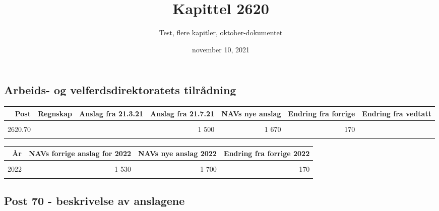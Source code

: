 \documentclass[
]{article}
\title{Kapittel 2620}
\author{Test, flere kapitler, oktober-dokumentet}
\date{november 10, 2021}
\begin{document}
\maketitle

\hypertarget{arbeids--og-velferdsdirektoratets-tilruxe5dning}{%
\subsection{Arbeids- og velferdsdirektoratets
tilrådning}\label{arbeids--og-velferdsdirektoratets-tilruxe5dning}}

\begingroup\fontsize{8}{10}\selectfont

\begin{tabular}{rrrrrrr}
\toprule
Post & Regnskap  & Anslag fra 21.3.21 & Anslag fra 21.7.21 & NAVs nye anslag & Endring fra forrige & Endring fra vedtatt\\
\midrule
\cellcolor{gray!6}{2620.70} & \cellcolor{gray!6}{1 669} & \cellcolor{gray!6}{1 700} & \cellcolor{gray!6}{1 500} & \cellcolor{gray!6}{1 670} & \cellcolor{gray!6}{170} & \cellcolor{gray!6}{-30}\\
2620.70 &  &  & 1 500 & 1 670 & 170 \vphantom{1} & \\
\cellcolor{gray!6}{2620.70} & \cellcolor{gray!6}{} & \cellcolor{gray!6}{} & \cellcolor{gray!6}{1 500} & \cellcolor{gray!6}{1 670} & \cellcolor{gray!6}{170} & \cellcolor{gray!6}{}\\
\bottomrule
\end{tabular}
\endgroup{}

\hspace{4cm}

\begingroup\fontsize{8}{10}\selectfont

\begin{tabular}{rrrr}
\toprule
År & NAVs forrige anslag for 2022 & NAVs nye anslag 2022 & Endring fra forrige 2022\\
\midrule
\cellcolor{gray!6}{2022} & \cellcolor{gray!6}{1 530} & \cellcolor{gray!6}{1 700} & \cellcolor{gray!6}{\vphantom{2} 170}\\
2022 & 1 530 & 1 700 & \vphantom{1} 170\\
\cellcolor{gray!6}{2022} & \cellcolor{gray!6}{1 530} & \cellcolor{gray!6}{1 700} & \cellcolor{gray!6}{170}\\
\bottomrule
\end{tabular}
\endgroup{}

\hypertarget{post-70---beskrivelse-av-anslagene}{%
\subsection{Post 70 - beskrivelse av
anslagene}\label{post-70---beskrivelse-av-anslagene}}
\end{document}

